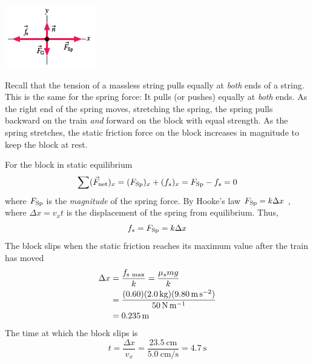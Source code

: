 \begin{Answer}
    \begin{center}
        \includegraphics[totalheight=0.2\textheight]{../figures/spring-block-free-body.png}
        \label{fig:spring-block-free-body}
    \end{center}

    Recall that the tension of a massless string pulls equally at \emph{both}
    ends of a string.  This is the same for the spring force:  It pulls
    (or pushes) equally at \emph{both} ends.  As the right end of the
    spring moves, stretching the spring, the spring pulls backward on
    the train \emph{and} forward on the block with equal strength.  As
    the spring stretches, the static friction force on the block
    increases in magnitude to keep the block at rest.

    For the block in static equilibrium
    \begin{equation}
        \sum (\vec{F}_{\mathrm{net}})_x = (F_\mathrm{Sp})_x + (f_s)_x = F_\mathrm{Sp} - f_s = 0
    \end{equation}
    where
    $
        F_\mathrm{Sp}
    $ is the \emph{magnitude} of the spring force.  By Hooke's law
    $
        F_\mathrm{Sp} = k\Delta x
    $%
    , where
    $
        \Delta x = v_x t
    $ is the displacement of the spring from equilibrium.  Thus,
    \begin{equation}
        f_s = F_\mathrm{Sp} = k \Delta x
    \end{equation}
    The block slips when the static friction reaches its maximum value
    after the train has moved
    \begin{align}
        \Delta x &= \frac{f_{\mathrm{s~max}}}{k} = \frac{\mu_s mg}{k}\\
        &= \frac{ (0.60)(\qty{2.0}{\kilo\gram})(\qty{9.80}{\metre\per\square\second})
        } {\qty{50}{\newton\per\metre}} \\
        &= \qty{0.235}{\metre}
    \end{align}
    The time at which the block slips is
    \begin{equation}
        t = \frac{\Delta x}{v_x} = \frac{\qty{23.5}{\centi\metre}}{\qty{5.0}
        {\centi\metre\per\second}} = \qty{4.7}{\second}
    \end{equation}
\end{Answer}

